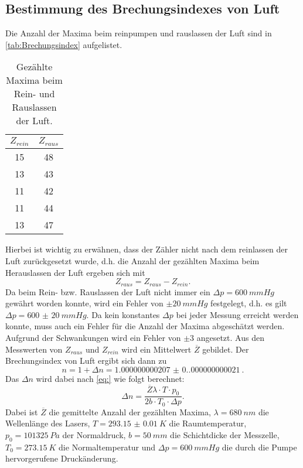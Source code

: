 \subsection{Bestimmung des Brechungsindexes von Luft}
Die Anzahl der Maxima beim reinpumpen und rauslassen der Luft sind in \autoref{tab:Brechungsindex} aufgelistet.
\begin{table}[H]
  \centering
  \caption{Gezählte Maxima beim Rein- und Rauslassen der Luft.}
  \begin{tabular}{c c}
      \toprule
      $Z_{rein}$ & $Z_{raus}$\\
      \midrule
      15 & 48\\
      13 & 43\\
      11 & 42\\
      11 & 44\\
      13 & 47\\
      \bottomrule
  \end{tabular}
  \label{tab:wellenleange}
\end{table}
Hierbei ist wichtig zu erwähnen, dass der Zähler nicht nach dem reinlassen der Luft zurückgesetzt wurde, d.h. die Anzahl der gezählten Maxima beim Herauslassen der Luft
ergeben sich mit
\begin{equation*}
  Z_{raus} = Z_{raus} - Z_{rein}.
\end{equation*}
Da beim Rein- bzw. Rauslassen der Luft nicht immer ein $\Delta p = \SI{600}{mmHg}$ gewährt worden konnte, wird ein Fehler von $\pm \SI{20}{mmHg}$ festgelegt, d.h. es gilt 
$\Delta p = \SI{600(20)}{mmHg}$.
Da kein konstantes $\Delta p$ bei jeder Messung erreicht werden konnte, muss auch ein Fehler für die Anzahl der Maxima abgeschätzt werden. Aufgrund der Schwankungen
wird ein Fehler von $\pm 3$ angesetzt.
Aus den Messwerten von $Z_{raus}$ und $Z_{rein}$ wird ein Mittelwert $\overline{Z}$ gebildet. Der Brechungsindex von Luft ergibt sich dann zu
\begin{equation*}
  n = 1 + \Delta n = \SI{1.000000000207(0.000000000021)}{}.
\end{equation*}
Das $\Delta n$ wird dabei nach \autoref{eq:} wie folgt berechnet:
\begin{equation*}
  \Delta n = \frac{\overline{Z}\lambda \cdot T \cdot p_0}{2b \cdot T_0 \cdot \Delta p}.
\end{equation*}
Dabei ist $\overline{Z}$ die gemittelte Anzahl der gezählten Maxima, $\lambda = \SI{680}{nm}$ die Wellenlänge des Lasers, $T = \SI{293.15(1)}{K}$ die Raumtemperatur,
$p_0 = \SI{101325}{Pa}$ \cite{p_normal} der Normaldruck, $b = \SI{50}{mm}$ die Schichtdicke der Messzelle, $T_0 = \SI{273.15}{K}$ die Normaltemperatur und $\Delta p = \SI{600}{mmHg}$
die durch die Pumpe hervorgerufene Druckänderung.
